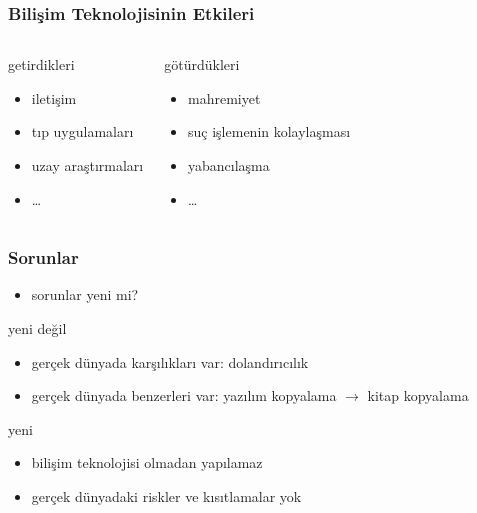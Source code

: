 \documentclass[dvipsnames]{beamer}
\theoremstyle{plain}
\begin{document}
\begin{frame}
  \frametitle{Bilişim Teknolojisinin Etkileri}

  \begin{columns}
    \begin{block}{getirdikleri}
      \begin{itemize}
        \item iletişim
        \item tıp uygulamaları
        \item uzay araştırmaları
        \item \ldots
      \end{itemize}
    \end{block}

    \pause
    \begin{block}{götürdükleri}
      \begin{itemize}
        \item mahremiyet
        \item suç işlemenin kolaylaşması
        \item yabancılaşma
        \item \ldots
      \end{itemize}
    \end{block}
  \end{columns}
\end{frame}

\begin{frame}
  \frametitle{Sorunlar}

  \begin{itemize}
    \item sorunlar yeni mi?
  \end{itemize}

  \begin{block}{yeni değil}
    \begin{itemize}
      \item gerçek dünyada karşılıkları var: dolandırıcılık
      \item gerçek dünyada benzerleri var:
        yazılım kopyalama $\rightarrow$ kitap kopyalama
    \end{itemize}
  \end{block}

  \pause
  \begin{block}{yeni}
    \begin{itemize}
      \item bilişim teknolojisi olmadan yapılamaz
      \item gerçek dünyadaki riskler ve kısıtlamalar yok
    \end{itemize}
  \end{block}
\end{frame}
\end{document}
